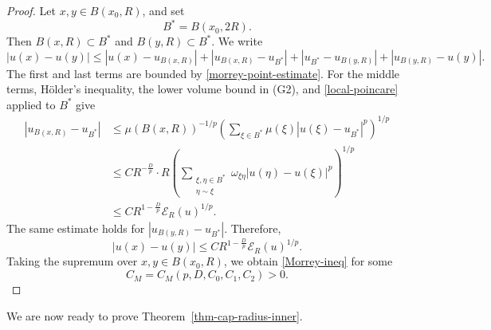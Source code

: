 \documentclass[twoside,12pt,letter]{article}
\theoremstyle{plain}
\theoremstyle{definition}
\theoremstyle{remark}
\numberwithin{equation}{section}
\begin{document}
\begin{proof}
Let \(x,y\in B(x_0,R)\), and set
\[
B^*=B(x_0,2R).
\]
Then \(B(x,R)\subset B^*\) and \(B(y,R)\subset B^*\). We write
\[
|u(x)-u(y)|
\le
|u(x)-u_{B(x,R)}|
+
|u_{B(x,R)}-u_{B^*}|
+
|u_{B^*}-u_{B(y,R)}|
+
|u_{B(y,R)}-u(y)|.
\]
The first and last terms are bounded by \eqref{morrey-point-estimate}. For the
middle terms, H\"older's inequality, the lower volume bound in {\rm(G2)}, and
\eqref{local-poincare} applied to \(B^*\) give
\[
\begin{aligned}
|u_{B(x,R)}-u_{B^*}|
&\le
\mu(B(x,R))^{-1/p}
\left(
\sum_{\xi\in B^*}\mu(\xi)|u(\xi)-u_{B^*}|^p
\right)^{1/p}  \\
&\le
C R^{-\frac{D}{p}}
\cdot R
\left(
\sum_{\substack{\xi,\eta\in B^*\\ \eta\sim \xi}}
\omega_{\xi\eta}|u(\eta)-u(\xi)|^p
\right)^{1/p}  \\
&\le
C R^{1-\frac{D}{p}}\mathcal{E}_R(u)^{1/p}.
\end{aligned}
\]
The same estimate holds for \(|u_{B(y,R)}-u_{B^*}|\). Therefore,
\[
|u(x)-u(y)|
\le
C R^{1-\frac{D}{p}}\mathcal{E}_R(u)^{1/p}.
\]
Taking the supremum over \(x,y\in B(x_0,R)\), we obtain
\eqref{Morrey-ineq} for some
\[
C_M=C_M(p,D,C_0,C_1,C_2)>0.
\]
\end{proof}

We are now ready to prove Theorem~\ref{thm-cap-radius-inner}.
\end{document}
